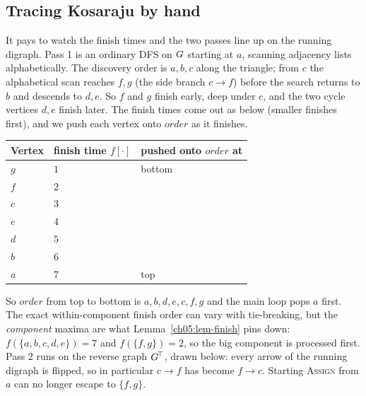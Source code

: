 \subsection{Tracing Kosaraju by hand}

It pays to watch the finish times and the two passes line up on the running digraph. Pass 1 is an ordinary DFS on $G$ starting at $a$, scanning adjacency lists alphabetically. The discovery order is $a,b,c$ along the triangle; from $c$ the alphabetical scan reaches $f,g$ (the side branch $c\to f$) before the search returns to $b$ and descends to $d,e$. So $f$ and $g$ finish early, deep under $c$, and the two cycle vertices $d,e$ finish later. The finish times come out as below (smaller finishes first), and we push each vertex onto $\mathit{order}$ as it finishes.

\begin{center}\small
\begin{longtable}{l l l}
\toprule
Vertex & finish time $f[\cdot]$ & pushed onto $\mathit{order}$ at \\
\midrule
$g$ & $1$ & bottom \\
$f$ & $2$ & \\
$c$ & $3$ & \\
$e$ & $4$ & \\
$d$ & $5$ & \\
$b$ & $6$ & \\
$a$ & $7$ & top \\
\bottomrule
\end{longtable}
\end{center}

So $\mathit{order}$ from top to bottom is $a,b,d,e,c,f,g$ and the main loop pops $a$ first. The exact within-component finish order can vary with tie-breaking, but the \emph{component} maxima are what Lemma~\ref{ch05:lem-finish} pins down: $f(\{a,b,c,d,e\})=7$ and $f(\{f,g\})=2$, so the big component is processed first. Pass 2 runs on the reverse graph $G^{\!\top}$, drawn below: every arrow of the running digraph is flipped, so in particular $c\to f$ has become $f\to c$. Starting \textsc{Assign} from $a$ can no longer escape to $\{f,g\}$.

\begin{center}
\end{center}

